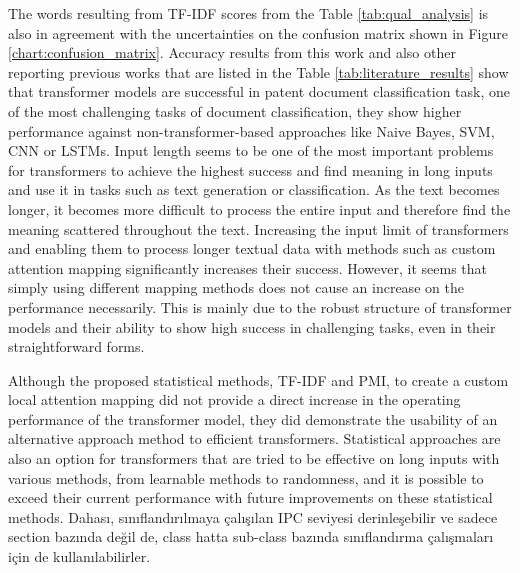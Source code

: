 \documentclass{iyte}
\begin{document}
The words resulting from TF-IDF scores from the Table \ref{tab:qual_analysis} is also in agreement with the uncertainties on the confusion matrix shown in Figure \ref{chart:confusion_matrix}. Accuracy results from this work and also other reporting previous works that are listed in the Table \ref{tab:literature_results} show that transformer models are successful in patent document classification task, one of the most challenging tasks of document classification, they show higher performance against non-transformer-based approaches like Naive Bayes, SVM, CNN or LSTMs. Input length seems to be one of the most important problems for transformers to achieve the highest success and find meaning in long inputs and use it in tasks such as text generation or classification. As the text becomes longer, it becomes more difficult to process the entire input and therefore find the meaning scattered throughout the text. Increasing the input limit of transformers and enabling them to process longer textual data with methods such as custom attention mapping significantly increases their success. However, it seems that simply using different mapping methods does not cause an increase on the performance necessarily. This is mainly due to the robust structure of transformer models and their ability to show high success in challenging tasks, even in their straightforward forms.

Although the proposed statistical methods, TF-IDF and PMI, to create a custom local attention mapping did not provide a direct increase in the operating performance of the transformer model, they did demonstrate the usability of an alternative approach method to efficient transformers. Statistical approaches are also an option for transformers that are tried to be effective on long inputs with various methods, from learnable methods to randomness, and it is possible to exceed their current performance with future improvements on these statistical methods. Dahası, sınıflandırılmaya çalışılan IPC seviyesi derinleşebilir ve sadece section bazında değil de, class hatta sub-class bazında sınıflandırma çalışmaları için de kullanılabilirler.



\end{document}

